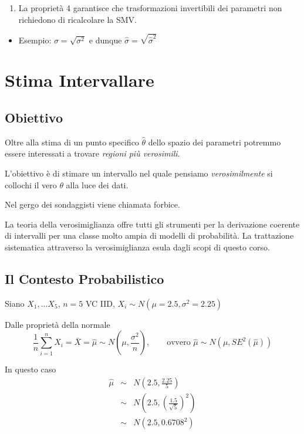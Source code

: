 \documentclass[
  11pt,
]{book}
\providecommand{\tightlist}{%
  \setlength{\itemsep}{0pt}\setlength{\parskip}{0pt}}
\theoremstyle{mytheoremstyle}
\theoremstyle{mydefstyle}
\begin{document}
\begin{enumerate}
\def\labelenumi{\arabic{enumi}.}
\setcounter{enumi}{3}
\tightlist
\item
  La proprietà 4 garantisce che trasformazioni invertibili dei parametri non
  richiedono di ricalcolare la SMV.
\end{enumerate}

\begin{itemize}
\tightlist
\item
  Esempio: \(\sigma=\sqrt{\sigma^2}\) e dunque \(\hat\sigma=\sqrt{\hat\sigma^2}\)
\end{itemize}

\chapter{Stima Intervallare}\label{stima-intervallare}

\section{Obiettivo}\label{obiettivo-2}

Oltre alla stima di un punto specifico \(\hat\theta\) dello spazio dei parametri potremmo essere interessati a trovare \emph{regioni più verosimili}.

L'obiettivo è di stimare un intervallo nel quale pensiamo \emph{verosimilmente} si collochi il vero \(\theta\) alla luce dei dati.

Nel gergo dei sondaggisti viene chiamata forbice.

La teoria della verosimiglianza offre tutti gli strumenti per la derivazione coerente di intervalli per una classe molto ampia di modelli di probabilità. La trattazione sistematica attraverso la verosimiglianza esula dagli scopi di questo corso.

\section{Il Contesto Probabilistico}\label{il-contesto-probabilistico}

Siano \(X_1,...X_5\), \(n=5\) VC IID, \(X_i\sim N(\mu=2.5,\sigma^2=2.25)\)

Dalle proprietà della normale
\[\frac 1 n \sum_{i=1}^n X_i=\bar X=\hat\mu\sim N\left(\mu,\frac{\sigma^2}{n}\right), \qquad\text{ovvero }\hat \mu\sim N\left(\mu,SE^2(\hat \mu)\right) \]

In questo caso
\begin{eqnarray*}
\hat \mu &\sim& N\left(2.5,\frac{2.25}{5}\right)\\
       &\sim& N\left(2.5,\left(\frac{1.5}{\sqrt{5}}\right)^2\right)\\
       &\sim& N\left(2.5,0.6708^2\right)
\end{eqnarray*}
\end{document}
